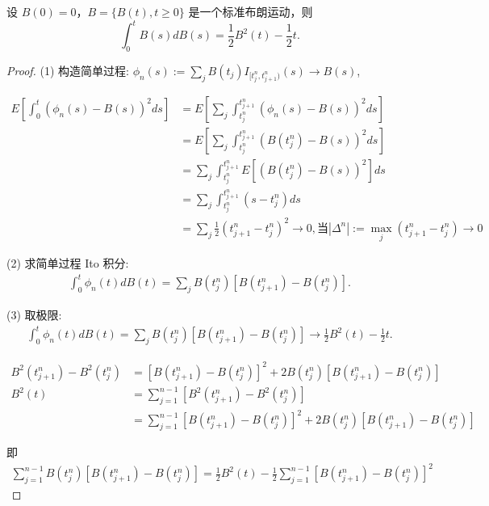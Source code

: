 \documentclass[lang=cn,10pt,thmcnt=section]{elegantbook}
\begin{document}
\begin{example}
	设 \( B(0) = 0 \)，\( B = \{B(t), t \geq 0\} \) 是一个标准布朗运动，则
\[
\int_0^t B(s) dB(s) = \frac{1}{2} B^2(t) - \frac{1}{2} t.
\]
\end{example}
\begin{proof}
    (1) 构造简单过程: \(\phi_n(s) := \sum_j B(t_j) I_{[t_j^n, t_{j+1}^n)}(s) \rightarrow B(s)\),

    \begin{align*}
    E\left[\int_0^t (\phi_n(s) - B(s))^2 ds\right] &= E\left[\sum_j \int_{t_j^n}^{t_{j+1}^n} (\phi_n(s) - B(s))^2 ds\right] \\
    &= E\left[\sum_j \int_{t_j^n}^{t_{j+1}^n} (B(t_j^n) - B(s))^2 ds\right] \\
    &= \sum_j \int_{t_j^n}^{t_{j+1}^n} E[(B(t_j^n) - B(s))^2] ds \\
    &= \sum_j \int_{t_j^n}^{t_{j+1}^n} (s - t_j^n) ds \\
    &= \sum_j \frac{1}{2}(t_{j+1}^n - t_j^n)^2 \rightarrow 0, \text{当} |\Delta^n| := \max_j (t_{j+1}^n - t_j^n) \rightarrow 0
    \end{align*}

    (2) 求简单过程 Ito 积分:
    \begin{align*}
    \int_0^t \phi_n(t) dB(t) = \sum_j B(t_j^n) [B(t_{j+1}^n) - B(t_j^n)].
    \end{align*}

    (3) 取极限: 
    \begin{align*}
    \int_0^t \phi_n(t) dB(t) = \sum_j B(t_j^n) [B(t_{j+1}^n) - B(t_j^n)] \rightarrow \frac{1}{2} B^2(t) - \frac{1}{2} t.
    \end{align*}

    \begin{align*}
    B^2(t_{j+1}^n) - B^2(t_j^n) &= [B(t_{j+1}^n) - B(t_j^n)]^2 + 2B(t_j^n) [B(t_{j+1}^n) - B(t_j^n)] \\
    B^2(t) &= \sum_{j=1}^{n-1} [B^2(t_{j+1}^n) - B^2(t_j^n)] \\
    &= \sum_{j=1}^{n-1} [B(t_{j+1}^n) - B(t_j^n)]^2 + 2B(t_j^n) [B(t_{j+1}^n) - B(t_j^n)]
    \end{align*}

    即 
    \begin{align*}
    \sum_{j=1}^{n-1} B(t_j^n) [B(t_{j+1}^n) - B(t_j^n)] = \frac{1}{2} B^2(t) - \frac{1}{2} \sum_{j=1}^{n-1} [B(t_{j+1}^n) - B(t_j^n)]^2
    \end{align*}
\end{proof}
\end{document}
